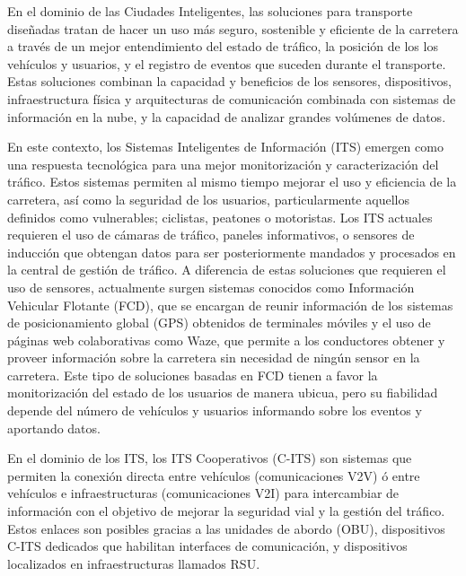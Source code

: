 En el dominio de las Ciudades Inteligentes, las soluciones para transporte diseñadas tratan de hacer un uso más seguro, sostenible y eficiente de la carretera a través de un mejor entendimiento del estado de tráfico, la posición de los los vehículos y usuarios, y el registro de eventos que suceden durante el transporte. Estas soluciones combinan la capacidad y beneficios de los sensores, dispositivos, infraestructura física y arquitecturas de comunicación combinada con sistemas de información en la nube, y la capacidad de analizar grandes volúmenes de datos.

En este contexto, los Sistemas Inteligentes de Información (ITS) emergen como una respuesta tecnológica para una mejor monitorización y caracterización del tráfico. Estos sistemas permiten al mismo tiempo mejorar el uso y eficiencia de la carretera, así como la seguridad de los usuarios, particularmente aquellos definidos como vulnerables; ciclistas, peatones o motoristas. Los ITS actuales requieren el uso de cámaras de tráfico, paneles informativos, o sensores de inducción que obtengan datos para ser posteriormente mandados y procesados en la central de gestión de tráfico. A diferencia de estas soluciones que requieren el uso de sensores, actualmente surgen sistemas conocidos como Información Vehicular Flotante (FCD), que se encargan de reunir información de los sistemas de posicionamiento global (GPS) obtenidos de terminales móviles y el uso de páginas web colaborativas como Waze, que permite a los conductores obtener y proveer información sobre la carretera sin necesidad de ningún sensor en la carretera. Este tipo de soluciones basadas en FCD tienen a favor la monitorización del estado de los usuarios de manera ubicua, pero su fiabilidad depende del número de vehículos y usuarios informando sobre los eventos y aportando datos.

En el dominio de los ITS, los ITS Cooperativos (C-ITS) son sistemas que permiten la conexión directa entre vehículos (comunicaciones V2V) ó entre vehículos e infraestructuras (comunicaciones V2I) para intercambiar de información con el objetivo de mejorar la seguridad vial y la gestión del tráfico. Estos enlaces son posibles gracias a las unidades de abordo (OBU), dispositivos C-ITS dedicados que habilitan interfaces de comunicación, y dispositivos localizados en infraestructuras llamados RSU.

